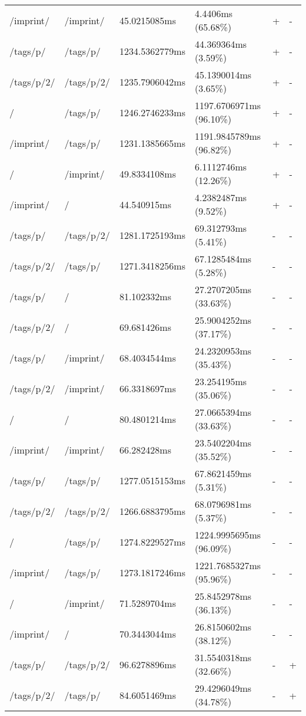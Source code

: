 \begin{center}
\begin{longtable}{llllll}
	/imprint/ & /imprint/ & 45.0215085ms & 4.4406ms (65.68\%) & + & - \\
	/tags/p/ & /tags/p/ & 1234.5362779ms & 44.369364ms (3.59\%) & + & - \\
	/tags/p/2/ & /tags/p/2/ & 1235.7906042ms & 45.1390014ms (3.65\%) & + & - \\
	\hline
	/ & /tags/p/ & 1246.2746233ms & 1197.6706971ms (96.10\%) & + & - \\
	/imprint/ & /tags/p/ & 1231.1385665ms & 1191.9845789ms (96.82\%) & + & - \\
	\hline
	/ & /imprint/ & 49.8334108ms & 6.1112746ms (12.26\%) & + & - \\
	/imprint/ & / & 44.540915ms & 4.2382487ms (9.52\%) & + & - \\
	\hline
	\hline
	/tags/p/ & /tags/p/2/ & 1281.1725193ms & 69.312793ms (5.41\%) & - & - \\
	/tags/p/2/ & /tags/p/ & 1271.3418256ms & 67.1285484ms (5.28\%) & - & - \\
	\hline
	/tags/p/ & / & 81.102332ms & 27.2707205ms (33.63\%) & - & - \\
	/tags/p/2/ & / & 69.681426ms & 25.9004252ms (37.17\%) & - & - \\
	/tags/p/ & /imprint/ & 68.4034544ms & 24.2320953ms (35.43\%) & - & - \\
	/tags/p/2/ & /imprint/ & 66.3318697ms & 23.254195ms (35.06\%) & - & - \\
	\hline
	/ & / & 80.4801214ms & 27.0665394ms (33.63\%) & - & - \\
	/imprint/ & /imprint/ & 66.282428ms & 23.5402204ms (35.52\%) & - & - \\
	/tags/p/ & /tags/p/ & 1277.0515153ms & 67.8621459ms (5.31\%) & - & - \\
	/tags/p/2/ & /tags/p/2/ & 1266.6883795ms & 68.0796981ms (5.37\%) & - & - \\
	\hline
	/ & /tags/p/ & 1274.8229527ms & 1224.9995695ms (96.09\%) & - & - \\
	/imprint/ & /tags/p/ & 1273.1817246ms & 1221.7685327ms (95.96\%) & - & - \\
	\hline
	/ & /imprint/ & 71.5289704ms & 25.8452978ms (36.13\%) & - & - \\
	/imprint/ & / & 70.3443044ms & 26.8150602ms (38.12\%) & - & - \\
	\hline
	\hline
	/tags/p/ & /tags/p/2/ & 96.6278896ms & 31.5540318ms (32.66\%) & - & + \\
	/tags/p/2/ & /tags/p/ & 84.6051469ms & 29.4296049ms (34.78\%) & - & + \\

\end{longtable}
\end{center}
